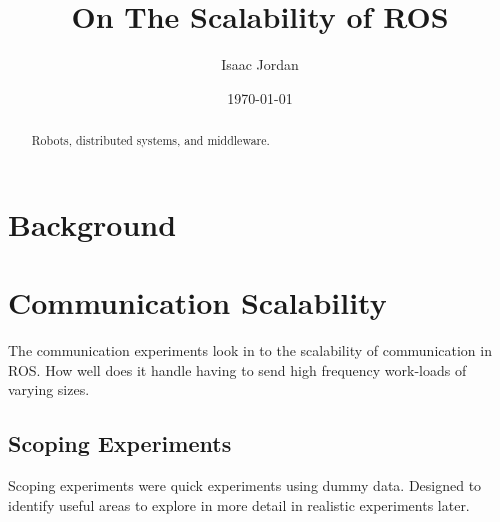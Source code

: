 \documentclass{l4proj}
\begin{document}
\title{On The Scalability of ROS}
\author{Isaac Jordan}
\date{\today}
\maketitle

\begin{abstract}
Robots, distributed systems, and middleware.
\end{abstract}

\educationalconsent
%
%
\tableofcontents






\chapter{Background}









\chapter{Communication Scalability}

The communication experiments look in to the scalability of communication in ROS. How well does it handle having to send high frequency work-loads of varying sizes.

\section{Scoping Experiments}

Scoping experiments were quick experiments using dummy data. Designed to identify useful areas to explore in more detail in realistic experiments later.
\end{document}

